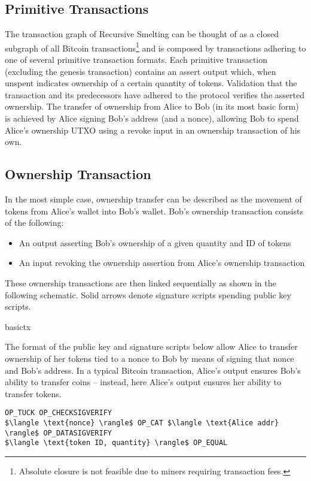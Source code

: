 \documentclass[9pt,oneside]{amsart}
\begin{document}
\begin{multicols}{2}
\section{Primitive Transactions}\label{sec:primtrans}
The transaction graph of Recursive Smelting can be thought of as a closed subgraph of all Bitcoin transactions\footnote{Absolute closure is not feasible due to miners requiring transaction fees.} and is composed by transactions adhering to one of several primitive transaction formats. Each primitive transaction (excluding the genesis transaction) contains an assert output which, when unspent indicates ownership of a certain quantity of tokens.  Validation that the transaction and its predecessors have adhered to the protocol verifies the asserted ownership. The transfer of ownership from Alice to Bob (in its most basic form) is achieved by Alice signing Bob's address (and a nonce), allowing Bob to spend Alice's ownership UTXO using a revoke input in an ownership transaction of his own.

\subsection{Ownership Transaction}\label{subsec:basicownershiptx}
In the most simple case, ownership transfer can be described as the movement of tokens from Alice's wallet into Bob's wallet. Bob's ownership transaction consists of the following:
\begin{itemize}
    \item An output asserting Bob's ownership of a given quantity and ID of tokens
    \item An input revoking the ownership assertion from Alice's ownership transaction
\end{itemize}

These ownership transactions are then linked sequentially as shown in the following schematic. Solid arrows denote signature scripts spending public key scripts.
\begin{center}
{basictx}
\end{center}

The format of the public key and signature scripts below allow Alice to transfer ownership of her tokens tied to a nonce to Bob by means of signing that nonce and Bob's address. In a typical Bitcoin transaction, Alice's output ensures Bob's ability to transfer coins -- instead, here Alice's output ensures her ability to transfer tokens.

\begin{lstlisting}[title={\textbf{Alice's Assert PubKey Script}}]
OP_TUCK OP_CHECKSIGVERIFY
$\langle \text{nonce} \rangle$ OP_CAT $\langle \text{Alice addr} \rangle$ OP_DATASIGVERIFY
$\langle \text{token ID, quantity} \rangle$ OP_EQUAL
\end{lstlisting}


\end{multicols}
\end{document}
